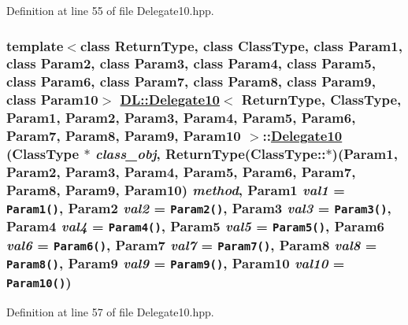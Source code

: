 Definition at line 55 of file Delegate10.hpp.\hypertarget{classDL_1_1Delegate10_a0}{
\subsubsection[Delegate10]{\setlength{\rightskip}{0pt plus 5cm}template$<$class Return\-Type, class Class\-Type, class Param1, class Param2, class Param3, class Param4, class Param5, class Param6, class Param7, class Param8, class Param9, class Param10$>$ \hyperlink{classDL_1_1Delegate10}{DL::Delegate10}$<$ Return\-Type, Class\-Type, Param1, Param2, Param3, Param4, Param5, Param6, Param7, Param8, Param9, Param10 $>$::\hyperlink{classDL_1_1Delegate10}{Delegate10} (Class\-Type $\ast$ {\em class\_\-obj}, Return\-Type(Class\-Type::$\ast$)(Param1, Param2, Param3, Param4, Param5, Param6, Param7, Param8, Param9, Param10) {\em method}, Param1 {\em val1} = {\tt Param1()}, Param2 {\em val2} = {\tt Param2()}, Param3 {\em val3} = {\tt Param3()}, Param4 {\em val4} = {\tt Param4()}, Param5 {\em val5} = {\tt Param5()}, Param6 {\em val6} = {\tt Param6()}, Param7 {\em val7} = {\tt Param7()}, Param8 {\em val8} = {\tt Param8()}, Param9 {\em val9} = {\tt Param9()}, Param10 {\em val10} = {\tt Param10()})}}
\label{classDL_1_1Delegate10_a0}




Definition at line 57 of file Delegate10.hpp.

